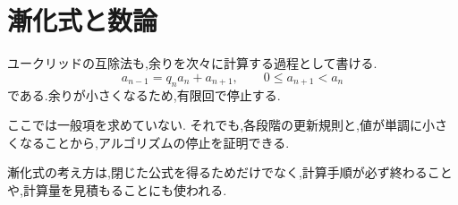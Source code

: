 
\section{漸化式と数論}

ユークリッドの互除法も,余りを次々に計算する過程として書ける.
\[
  a_{n-1}=q_na_n+a_{n+1},
  \qquad 0\leq a_{n+1}<a_n
\]
である.余りが小さくなるため,有限回で停止する.

ここでは一般項を求めていない.
それでも,各段階の更新規則と,値が単調に小さくなることから,アルゴリズムの停止を証明できる.

漸化式の考え方は,閉じた公式を得るためだけでなく,計算手順が必ず終わることや,計算量を見積もることにも使われる.